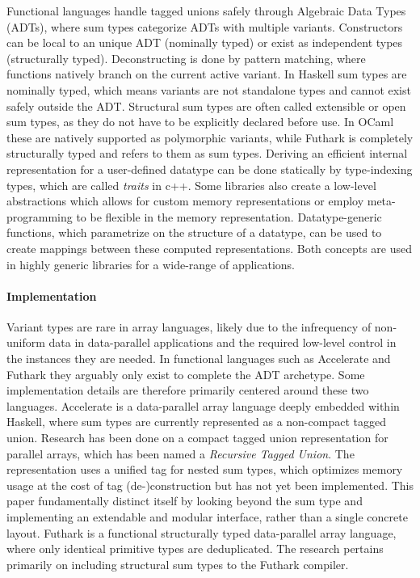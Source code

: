 \documentclass{article}
\begin{document}
Functional languages handle tagged unions safely through Algebraic Data Types (ADTs), where sum types categorize ADTs with multiple variants.
Constructors can be local to an unique ADT (nominally typed) or exist as independent types (structurally typed).
Deconstructing is done by pattern matching, where functions natively branch on the current active variant.
In Haskell sum types are nominally typed, which means variants are not standalone types and cannot exist safely outside the ADT.
Structural sum types are often called extensible or open sum types, as they do not have to be explicitly declared before use.
In OCaml these are natively supported as polymorphic variants, while Futhark is completely structurally typed and refers to them as sum types.
Deriving an efficient internal representation for a user-defined datatype can be done statically by type-indexing types\cite{associated-types}, which are called {\it traits} in c++.
Some libraries also create a low-level abstractions which allows for custom memory representations \cite{llama} or employ meta-programming to be flexible in the memory representation.
Datatype-generic functions, which parametrize on the structure of a datatype, can be used to create mappings between these computed representations.
Both concepts are used in highly generic libraries for a wide-range of applications\cite{generic-programming}. 

\paragraph{Implementation}

Variant types are rare in array languages, likely due to the infrequency of non-uniform data in data-parallel applications and the required low-level control in the instances they are needed.
In functional languages such as Accelerate and Futhark they arguably only exist to complete the ADT archetype.
Some implementation details are therefore primarily centered around these two languages.
Accelerate is a data-parallel array language deeply embedded within Haskell, where sum types are currently represented as a non-compact tagged union.
Research has been done on a compact tagged union representation for parallel arrays, which has been named a {\it Recursive Tagged Union}\cite{accelerate-sum-types}.
The representation uses a unified tag for nested sum types, which optimizes memory usage at the cost of tag (de-)construction but has not yet been implemented. 
This paper fundamentally distinct itself by looking beyond the sum type and implementing an extendable and modular interface, rather than a single concrete layout. 
Futhark is a functional structurally typed data-parallel array language, where only identical primitive types are deduplicated.
The research pertains primarily on including structural sum types to the Futhark compiler\cite{futhark-sum-types}.
\end{document}

